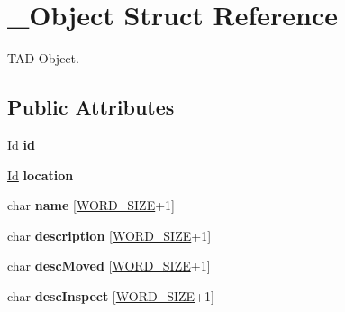 \hypertarget{struct___object}{\section{\-\_\-\-Object Struct Reference}
\label{struct___object}
}


T\-A\-D Object.  


\subsection*{Public Attributes}
\begin{DoxyCompactItemize}
\item 
\hypertarget{struct___object_a3cff7a0e8dc4e9d23895ed9af1b7653a}{\hyperlink{_types_8h_a845e604fb28f7e3d97549da3448149d3}{Id} {\bfseries id}}\label{struct___object_a3cff7a0e8dc4e9d23895ed9af1b7653a}

\item 
\hypertarget{struct___object_a3c596b8898734de2f71fd1a33dfa72fb}{\hyperlink{_types_8h_a845e604fb28f7e3d97549da3448149d3}{Id} {\bfseries location}}\label{struct___object_a3c596b8898734de2f71fd1a33dfa72fb}

\item 
\hypertarget{struct___object_a03fb9b8d91f071e8e30d669be79cc040}{char {\bfseries name} \mbox{[}\hyperlink{_types_8h_a92ed8507d1cd2331ad09275c5c4c1c89}{W\-O\-R\-D\-\_\-\-S\-I\-Z\-E}+1\mbox{]}}\label{struct___object_a03fb9b8d91f071e8e30d669be79cc040}

\item 
\hypertarget{struct___object_add691deed525492ad692cc2f5bccfe90}{char {\bfseries description} \mbox{[}\hyperlink{_types_8h_a92ed8507d1cd2331ad09275c5c4c1c89}{W\-O\-R\-D\-\_\-\-S\-I\-Z\-E}+1\mbox{]}}\label{struct___object_add691deed525492ad692cc2f5bccfe90}

\item 
\hypertarget{struct___object_ae637e2b2c556d55cc7e1b452258afb9d}{char {\bfseries desc\-Moved} \mbox{[}\hyperlink{_types_8h_a92ed8507d1cd2331ad09275c5c4c1c89}{W\-O\-R\-D\-\_\-\-S\-I\-Z\-E}+1\mbox{]}}\label{struct___object_ae637e2b2c556d55cc7e1b452258afb9d}

\item 
\hypertarget{struct___object_af9a90ba94e000046703a3acbe3ab0ac9}{char {\bfseries desc\-Inspect} \mbox{[}\hyperlink{_types_8h_a92ed8507d1cd2331ad09275c5c4c1c89}{W\-O\-R\-D\-\_\-\-S\-I\-Z\-E}+1\mbox{]}}\label{struct___object_af9a90ba94e000046703a3acbe3ab0ac9}


\end{DoxyCompactItemize}

